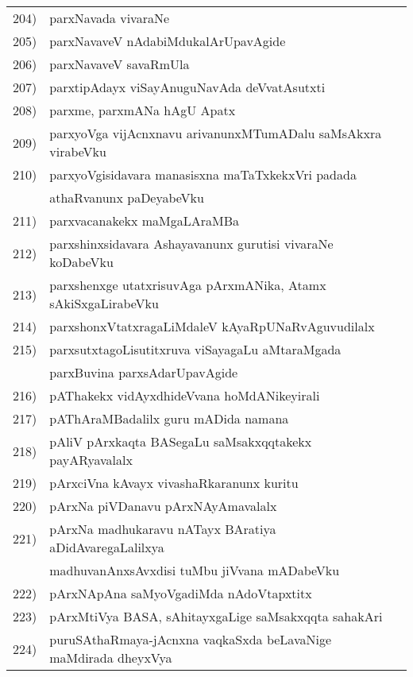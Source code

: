 {\begin{longtable}{@{}cp{7.4cm}r}
204) & parxNavada vivaraNe & \pageref{page121}\\
205) & parxNavaveV nAdabiMdukalArUpavAgide & \pageref{page161}\\
206) & parxNavaveV savaRmUla & \pageref{page100}\\
207) & parxtipAdayx viSayAnuguNavAda deVvatAsutxti & \pageref{page128}\\
208) & parxme, parxmANa hAgU Apatx & \pageref{page135}\\
209) & parxyoVga vijAcnxnavu arivanunxMTumADalu saMsAkxra virabeVku & \pageref{page162}\\
210) & parxyoVgisidavara manasisxna maTaTxkekxVri padada & \\
     & athaRvanunx paDeyabeVku & \pageref{page216}\\
211) & parxvacanakekx maMgaLAraMBa & \pageref{page102}\\ 
212) & parxshinxsidavara Ashayavanunx gurutisi vivaraNe koDabeVku & \pageref{page218}\\
213) & parxshenxge utatxrisuvAga pArxmANika, Atamx sAkiSxgaLirabeVku & \pageref{page141}\\
214) & parxshonxVtatxragaLiMdaleV kAyaRpUNaRvAguvudilalx & \pageref{page213}\\
215) & parxsutxtagoLisutitxruva viSayagaLu aMtaraMgada  & \\
     & parxBuvina parxsAdarUpavAgide & \pageref{page130}\\
216) & pAThakekx vidAyxdhideVvana hoMdANikeyirali & \pageref{page64}\\
217) & pAThAraMBadalilx guru mADida namana & \pageref{page64}\\
218) & pAliV pArxkaqta BASegaLu saMsakxqqtakekx payARyavalalx & \pageref{page44}\\
219) & pArxciVna kAvayx vivashaRkaranunx kuritu & \pageref{page247}\\
220) & pArxNa piVDanavu pArxNAyAmavalalx &\pageref{page202}\\  
221) & pArxNa madhukaravu nATayx BAratiya aDidAvaregaLalilxya & \\
     & madhuvanAnxsAvxdisi tuMbu jiVvana mADabeVku & \pageref{page81}\\
222) & pArxNApAna saMyoVgadiMda nAdoVtapxtitx & \pageref{page170}\\
223) & pArxMtiVya BASA, sAhitayxgaLige saMsakxqqta sahakAri & \pageref{page36}\\
224) & puruSAthaRmaya-jAcnxna vaqkaSxda beLavaNige maMdirada dheyxVya & \pageref{page65}\\

\end{longtable}}
